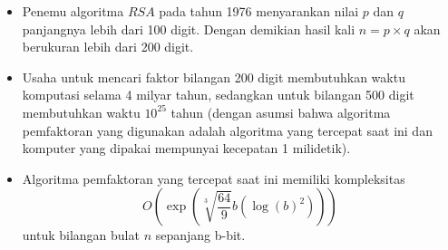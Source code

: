 \documentclass{article}
\begin{document}

\begin{itemize}
    \item Penemu algoritma $RSA$ pada tahun 1976 menyarankan nilai $p$ dan $q$ panjangnya lebih dari 100 digit. Dengan demikian hasil kali $n = p \times q$ akan berukuran lebih dari 200 digit.
    \item Usaha untuk mencari faktor bilangan 200 digit membutuhkan waktu komputasi selama 4 milyar tahun, sedangkan untuk bilangan 500 digit membutuhkan waktu $10^{25}$ tahun (dengan asumsi bahwa algoritma pemfaktoran yang digunakan adalah algoritma yang tercepat saat ini dan komputer yang dipakai mempunyai kecepatan 1 milidetik).
    \item Algoritma pemfaktoran yang tercepat saat ini memiliki kompleksitas
    \[ O(\exp(\sqrt[3]{\frac{64}{9}}b(\log(b)^2))) \]
    untuk bilangan bulat $n$ sepanjang b-bit.
\end{itemize}
\end{document}
